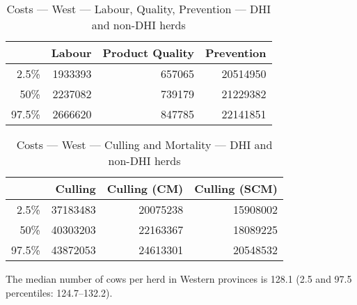 \documentclass{article}\usepackage[]{graphicx}\usepackage[]{color}
\begin{document}
\begin{table}[ht]
\centering
\begin{tabular}{rrrr}
  \hline
 & Labour & Product Quality & Prevention \\ 
  \hline
2.5\% & 1933393 & 657065 & 20514950 \\ 
  50\% & 2237082 & 739179 & 21229382 \\ 
  97.5\% & 2666620 & 847785 & 22141851 \\ 
   \hline
\end{tabular}
\caption{Costs --- West --- Labour, Quality, Prevention --- DHI and non-DHI herds} 
\label{tab:west2:b}
\end{table}
\begin{table}[ht]
\centering
\begin{tabular}{rrrr}
  \hline
 & Culling & Culling (CM) & Culling (SCM) \\ 
  \hline
2.5\% & 37183483 & 20075238 & 15908002 \\ 
  50\% & 40303203 & 22163367 & 18089225 \\ 
  97.5\% & 43872053 & 24613301 & 20548532 \\ 
   \hline
\end{tabular}
\caption{Costs --- West --- Culling and Mortality --- DHI and non-DHI herds} 
\label{tab:west2:c}
\end{table}


The median number of cows per herd in Western provinces is
128.1 (2.5 and 97.5 percentiles:
124.7--132.2).
\clearpage






\end{document}
